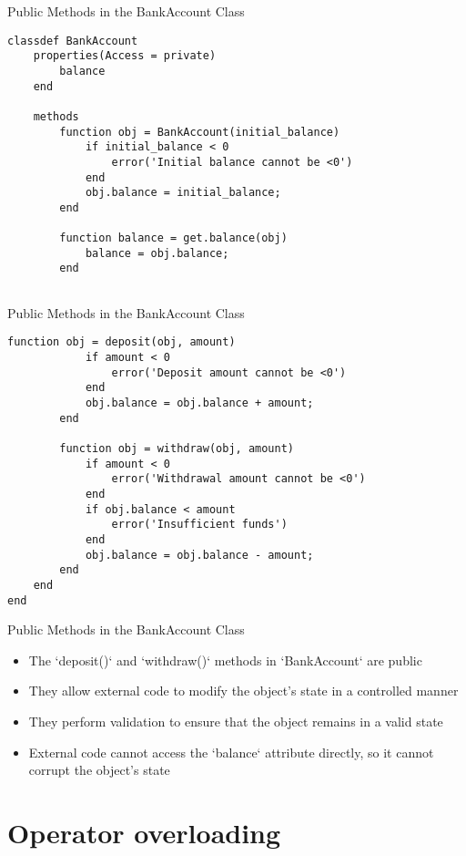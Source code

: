 \documentclass[handout]{beamer}
\begin{document}
\begin{frame}[fragile]{Public Methods in the BankAccount Class}
  \begin{lstlisting}[style=matlab]
classdef BankAccount
    properties(Access = private)
        balance
    end
    
    methods
        function obj = BankAccount(initial_balance)
            if initial_balance < 0
                error('Initial balance cannot be <0')
            end
            obj.balance = initial_balance;
        end
        
        function balance = get.balance(obj)
            balance = obj.balance;
        end
    
  \end{lstlisting}
\end{frame}    
\begin{frame}[fragile]{Public Methods in the BankAccount Class}
  \begin{lstlisting}[style=matlab]
        function obj = deposit(obj, amount)
            if amount < 0
                error('Deposit amount cannot be <0')
            end
            obj.balance = obj.balance + amount;
        end
        
        function obj = withdraw(obj, amount)
            if amount < 0
                error('Withdrawal amount cannot be <0')
            end
            if obj.balance < amount
                error('Insufficient funds')
            end
            obj.balance = obj.balance - amount;
        end
    end
end

  \end{lstlisting}
\end{frame}

\begin{frame}[fragile]{Public Methods in the BankAccount Class}
  \begin{itemize}
    \item The `deposit()` and `withdraw()` methods in `BankAccount` are public
    \item They allow external code to modify the object's state in a controlled manner
    \item They perform validation to ensure that the object remains in a valid state
    \item External code cannot access the `balance` attribute directly, so it cannot corrupt the object's state
  \end{itemize}
\end{frame}

\section{Operator overloading}
\end{document}
